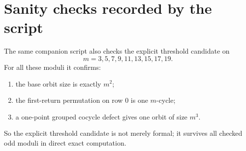 \documentclass[11pt]{article}
\begin{document}
\section{Sanity checks recorded by the script}
The same companion script also checks the explicit threshold candidate on
\[
 m=3,5,7,9,11,13,15,17,19.
\]
For all these moduli it confirms:
\begin{enumerate}[label=\textup{(\arabic*)},leftmargin=2.8em]
\item the base orbit size is exactly $m^2$;
\item the first-return permutation on row $0$ is one $m$-cycle;
\item a one-point grouped cocycle defect gives one orbit of size $m^3$.
\end{enumerate}
So the explicit threshold candidate is not merely formal; it survives all
checked odd moduli in direct exact computation.
\end{document}
